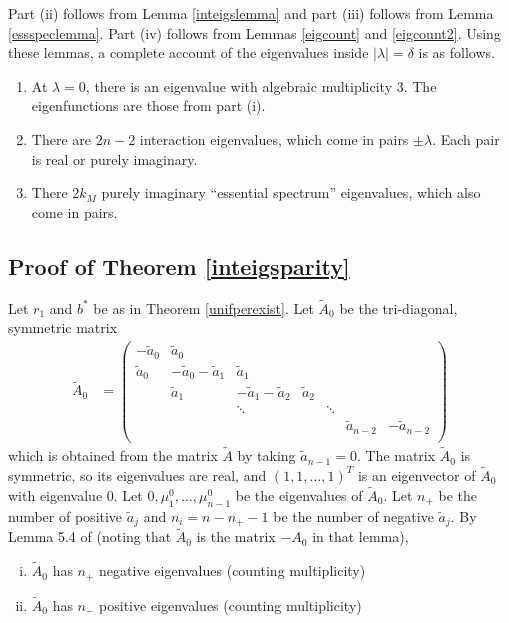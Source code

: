 \documentclass[thesis.tex]{subfiles}
\begin{document}
Part (ii) follows from Lemma \eqref{inteigslemma} and part (iii) follows from Lemma \ref{essspeclemma}. Part (iv) follows from Lemmas \ref{eigcount} and \ref{eigcount2}. Using these lemmas, a complete account of the eigenvalues inside $|\lambda| = \delta$ is as follows.
\begin{enumerate}
	\item At $\lambda = 0$, there is an eigenvalue with algebraic multiplicity 3. The eigenfunctions are those from part (i).
	\item There are $2n - 2$ interaction eigenvalues, which come in pairs $\pm \lambda$. Each pair is real or purely imaginary.
	\item There $2 k_M$ purely imaginary ``essential spectrum'' eigenvalues, which also come in pairs.
\end{enumerate}

\subsection{Proof of Theorem \ref{inteigsparity}}

Let $r_1$ and $b^*$ be as in Theorem \ref{unifperexist}. Let $\tilde{A}_0$ be the tri-diagonal, symmetric matrix 
\begin{align*}
\tilde{A}_0 &= \begin{pmatrix}
-\tilde{a}_0 & \tilde{a}_0 \\
\tilde{a}_0 & -\tilde{a}_0 - \tilde{a}_1 &  \tilde{a}_1 \\
& \tilde{a}_1 & -\tilde{a}_1 - \tilde{a}_2 &  \tilde{a}_2 \\
& & \ddots & & \ddots \\
& & & & & \tilde{a}_{n-2} & -\tilde{a}_{n-2} \\
\end{pmatrix}
\end{align*}
which is obtained from the matrix $\tilde{A}$ by taking $\tilde{a}_{n-1} = 0$. The matrix $\tilde{A}_0$ is symmetric, so its eigenvalues are real, and $(1, 1, \dots, 1)^T$ is an eigenvector of $\tilde{A}_0$ with eigenvalue 0. Let $0, \mu^0_1, \dots, \mu^0_{n-1}$ be the eigenvalues of $\tilde{A}_0$. Let $n_+$ be the number of positive $\tilde{a}_j$ and $n_i = n - n_+ - 1$ be the number of negative $\tilde{a}_j$. By Lemma 5.4 of \cite{Sandstede1998} (noting that $\tilde{A}_0$ is the matrix $-A_0$ in that lemma),
\begin{enumerate}[(i)]
\item $\tilde{A}_0$ has $n_+$ negative eigenvalues (counting multiplicity)
\item $\tilde{A}_0$ has $n_-$ positive eigenvalues (counting multiplicity)
\end{enumerate}
\end{document}
